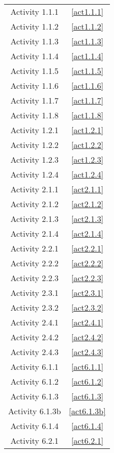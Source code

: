 
\begin{multicols}{2}
\begin{center}
\begingroup
	\tablelasttail{%
		\hline\hline
		}
\begin{supertabular}{cc}
	Activity 1.1.1	&	\ref{act1.1.1}\\
	Activity 1.1.2	&	\ref{act1.1.2}\\
	Activity 1.1.3	&	\ref{act1.1.3}\\
	Activity	 1.1.4	&	\ref{act1.1.4}\\
	Activity 1.1.5	&	\ref{act1.1.5}\\
	Activity 1.1.6	&	\ref{act1.1.6}\\
	Activity 1.1.7	&	\ref{act1.1.7}\\
	Activity 1.1.8	&	\ref{act1.1.8}\\	
	\hline
	Activity 1.2.1	&	\ref{act1.2.1}\\
	Activity 1.2.2	&	\ref{act1.2.2}\\
	Activity 1.2.3	&	\ref{act1.2.3}\\
	Activity 1.2.4	&	\ref{act1.2.4}\\
	\hline\hline
	Activity 2.1.1	&	\ref{act2.1.1}\\
	Activity 2.1.2	&	\ref{act2.1.2}\\
	Activity 2.1.3	&	\ref{act2.1.3}\\
	Activity	 2.1.4	&	\ref{act2.1.4}\\
	\hline
	Activity 2.2.1	&	\ref{act2.2.1}\\
	Activity 2.2.2	&	\ref{act2.2.2}\\
	Activity 2.2.3	&	\ref{act2.2.3}\\
	\hline
	Activity 2.3.1	&	\ref{act2.3.1}\\
	Activity 2.3.2	&	\ref{act2.3.2}\\
	\hline
	Activity 2.4.1	&	\ref{act2.4.1}\\
	Activity 2.4.2	&	\ref{act2.4.2}\\
	Activity 2.4.3	&	\ref{act2.4.3}\\
	\hline\hline
	Activity 6.1.1	&	\ref{act6.1.1}\\
	Activity 6.1.2	&	\ref{act6.1.2}\\
	Activity 6.1.3	&	\ref{act6.1.3}\\
	Activity 6.1.3b	&	\ref{act6.1.3b}\\
	Activity 6.1.4	&	\ref{act6.1.4}\\
	Activity 6.2.1	&	\ref{act6.2.1}\\
	\hline\hline
\end{supertabular}
\endgroup


\end{center}
\end{multicols}

